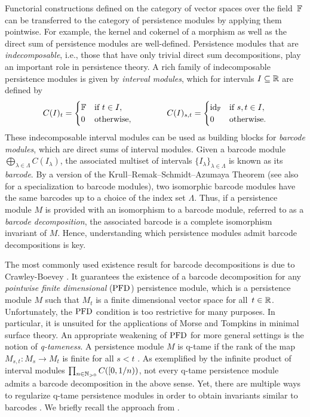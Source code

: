 Functorial constructions defined on the category of vector spaces over the field~$\mathbb{F}$ can be transferred to the category of persistence modules by applying them pointwise.
For example, the kernel and cokernel of a morphism as well as the direct sum of persistence modules are well-defined.
Persistence modules that are \emph{indecomposable}, i.e., those that have only trivial direct sum decompositions, play an important role in persistence theory.
A rich family of indecomposable persistence modules is given by \emph{interval modules}, which for intervals $I \subseteq \mathbb{R}$ are defined by
\begin{equation*}
C(I)_t =
\begin{cases}
\mathbb{F} & \text{if } t \in I, \\
0 & \text{otherwise},
\end{cases}
\qquad \qquad
C(I)_{s, t} =
\begin{cases}
\operatorname{id}_{\mathbb{F}} & \text{if } s, t \in I, \\
0 & \text{otherwise}.
\end{cases}
\end{equation*}
These indecomposable interval modules can be used as building blocks for \emph{barcode modules}, which are direct sums of interval modules.
Given a barcode module $\bigoplus_{\lambda \in \Lambda} C(I_{\lambda})$, the associated multiset of intervals $\{I_{\lambda}\}_{\lambda \in \Lambda}$ is known as its \emph{barcode}.
By a version of the Krull--Remak--Schmidt--Azumaya Theorem \cite{Azumaya.1950} (see also \cite[Theorem 2.7]{Chazal.2016a} for a specialization to barcode modules), two isomorphic barcode modules have the same barcodes up to a choice of the index set $\Lambda$.
Thus, if a persistence module $M$ is provided with an isomorphism to a barcode module, referred to as a \emph{barcode decomposition}, the associated barcode is a complete isomorphism invariant of $M$.
Hence, understanding which persistence modules admit barcode decompositions is key.

The most commonly used existence result for barcode decompositions is due to Crawley-Boevey \cite{Crawley-Boevey.2015}.
It guarantees the existence of a barcode decomposition for any \emph{pointwise finite dimensional} ($\mathrm{PFD}$) persistence module, which is a persistence module $M$ such that $M_t$ is a finite dimensional vector space for all~$t \in \mathbb{R}$.
Unfortunately, the $\mathrm{PFD}$ condition is too restrictive for many purposes.
In particular, it is unsuited for the applications of Morse and Tompkins in minimal surface theory.
An appropriate weakening of $\mathrm{PFD}$ for more general settings is the notion of \emph{q-tameness}.
A persistence module $M$ is q-tame if the rank of the map $M_{s,t} \colon M_s \to M_t$ is finite for all $s < t$ \cite{Chazal.2016a}.
As exemplified by the infinite product of interval modules $\prod_{n \in \mathbb{N}_{> 0}} C([0,1/n))$, not every q-tame persistence module admits a barcode decomposition in the above sense.
Yet, there are multiple ways to regularize q-tame persistence modules in order to obtain invariants similar to barcodes \cite{Chazal.2016a, Chazal.2016b, Schmahl.2021}.
We briefly recall the approach from \cite{Chazal.2016b}.

